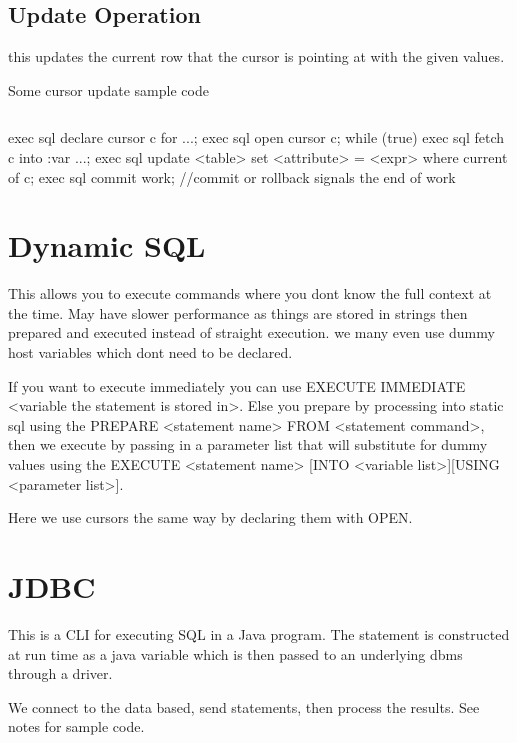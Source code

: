 \documentclass{article}
\begin{document}

\subsection*{Update Operation} %
\label{sec:update_operation}
this updates the current row that the cursor is pointing at with the given values.

Some cursor update sample code
\begin{verbatim}

\end{verbatim}
exec sql declare cursor c for ...;
exec sql open cursor c;
while (true){
    exec sql fetch c into :var ...;
    exec sql update <table> set <attribute> = <expr>
    where current of c;
    exec sql commit work;} //commit or rollback signals the end of work

\section*{Dynamic SQL} %
\label{sec:dynamic_sql}
This allows you to execute commands where you dont know the full context at the time. May have slower performance as things are stored in strings then prepared and executed instead of straight execution. we many even use dummy host variables which dont need to be declared.

If you want to execute immediately you can use EXECUTE IMMEDIATE <variable the statement is stored in>. Else you prepare by processing into static sql using the PREPARE <statement name> FROM <statement command>, then we execute by passing in a parameter list that will substitute for dummy values using the EXECUTE <statement name> [INTO <variable list>][USING <parameter list>].


Here we use cursors the same way by declaring them with OPEN.

\section*{JDBC} %
\label{sec:jdbc}
This is a CLI for executing SQL in a Java program. The statement is constructed at run time as a java variable which is then passed to an underlying dbms through a driver.

We connect to the data based, send statements, then process the results. See notes for sample code.
\end{document}
